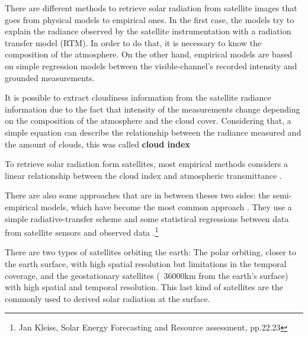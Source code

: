 There are different methods to retrieve solar radiation from satellite images that goes from physical models to empirical ones. In the first case, the models try to explain the radiance observed by the satellite instrumentation with a radiation transfer model (RTM). In order to do that, it is necessary to know the composition of the atmosphere. On the other hand, empirical models are based on simple regression models between the visible-channel's recorded intensity and grounded measurements. 

It is possible to extract cloudiness information from the satellite radiance information due to the fact that intensity of the measurements change depending on the composition of the atmosphere and the cloud cover. Considering that, a simple equation can describe the relationship between the radiance measured and the amount of clouds, this was called \textbf{cloud index} \cite*{Cano1986}

To retrieve solar radiation form satellites, most empirical methods considers a linear relationship between the cloud index and atmospheric transmittance \cite*{Cano1986, Diabate1987, Ineichen1999, Zarzalejo2005, Polo2008}.  

There are also some approaches that are in between theses two sides: the semi-empirical models, which have become the most common approach \cite*{Polo2008}. They use a simple radiative-transfer scheme and some statistical regressions between data from satellite sensors and observed data \cite*{schmetz1989, pinker1995}.\footnote{Jan Kleiss, Solar Energy Forecasting and Resource assessment, pp.22.23}


There are two types of satellites orbiting the earth: The polar orbiting, closer to the earth surface,  with high spatial resolution but limitations in the temporal coverage, and the geostationary satellites (~36000km from the earth's surface) with high spatial and temporal resolution. This last kind of satellites are the commonly used to derived solar radiation at the surface.

